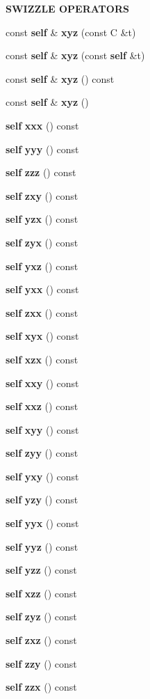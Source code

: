 \begin{Indent}{\bf SWIZZLE OPERATORS}\par
\begin{CompactItemize}
\item 
const {\bf self} \& {\bf xyz} (const C \&t)
\item 
const {\bf self} \& {\bf xyz} (const {\bf self} \&t)
\item 
const {\bf self} \& {\bf xyz} () const 
\item 
const {\bf self} \& {\bf xyz} ()
\item 
{\bf self} {\bf xxx} () const 
\item 
{\bf self} {\bf yyy} () const 
\item 
{\bf self} {\bf zzz} () const 
\item 
{\bf self} {\bf zxy} () const 
\item 
{\bf self} {\bf yzx} () const 
\item 
{\bf self} {\bf zyx} () const 
\item 
{\bf self} {\bf yxz} () const 
\item 
{\bf self} {\bf yxx} () const 
\item 
{\bf self} {\bf zxx} () const 
\item 
{\bf self} {\bf xyx} () const 
\item 
{\bf self} {\bf xzx} () const 
\item 
{\bf self} {\bf xxy} () const 
\item 
{\bf self} {\bf xxz} () const 
\item 
{\bf self} {\bf xyy} () const 
\item 
{\bf self} {\bf zyy} () const 
\item 
{\bf self} {\bf yxy} () const 
\item 
{\bf self} {\bf yzy} () const 
\item 
{\bf self} {\bf yyx} () const 
\item 
{\bf self} {\bf yyz} () const 
\item 
{\bf self} {\bf yzz} () const 
\item 
{\bf self} {\bf xzz} () const 
\item 
{\bf self} {\bf zyz} () const 
\item 
{\bf self} {\bf zxz} () const 
\item 
{\bf self} {\bf zzy} () const 
\item 
{\bf self} {\bf zzx} () const 
\end{CompactItemize}
\end{Indent}

